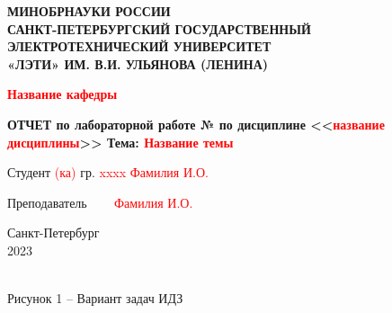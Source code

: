 \documentclass[a4paper]{article}
\date{}
\begin{document}
\begin{titlepage}
    \newpage

\begin{center}
	
	{\bfseries МИНОБРНАУКИ РОССИИ \\
		САНКТ-ПЕТЕРБУРГСКИЙ ГОСУДАРСТВЕННЫЙ\\
		ЭЛЕКТРОТЕХНИЧЕСКИЙ УНИВЕРСИТЕТ\\
		«ЛЭТИ» ИМ. В.И. УЛЬЯНОВА (ЛЕНИНА)}\\
	
	
	\vspace{0.25cm}
\end{center}
\begin{flushright}
	\begin{center}
		\textbf{\textcolor{red}{Название кафедры}}
	\end{center}
\end{flushright}  


\vspace{5cm}

\begin{center}
	
	\bfseries ОТЧЕТ \linebreak
	по лабораторной работе № \linebreak
	по дисциплине <<\textcolor{red}{название дисциплины}>> \linebreak
	Тема: \textcolor{red}{Название темы}
\end{center}

\vspace{3cm}

Студент \textcolor{red}{(ка)} гр. \textcolor{red}{xxxx} \hspace{7.07cm} \textcolor{red}{Фамилия И.О.}

Преподаватель ~~~\hspace{8cm} \textcolor{red}{Фамилия И.О.}

\vfill

\centering Санкт-Петербург \\ 2023

\end{titlepage}
\newpage
\setcounter{page}{2}

{
\\
}
{
\centering Рисунок 1 -- Вариант задач ИДЗ\\
}
\end{document}
